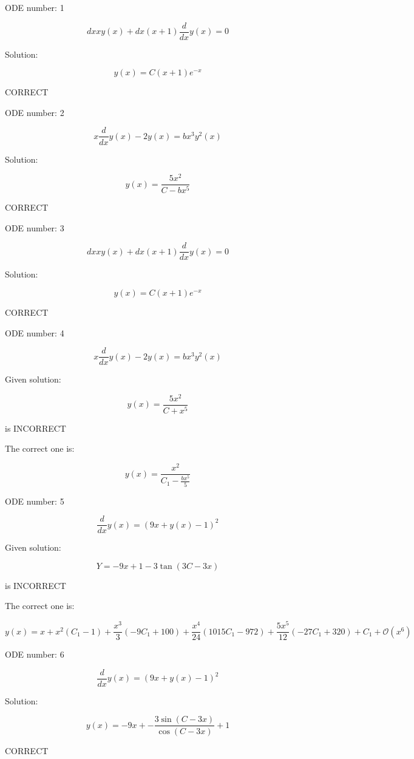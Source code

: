 \documentclass{article}
\begin{document}
        
ODE number: 1

$$
 dx x y{\left (x \right )} + dx \left(x + 1\right) \frac{d}{d x} y{\left (x \right )} = 0 
$$

Solution:

$$
 y{\left (x \right )} = C \left(x + 1\right) e^{- x} 
$$

CORRECT

ODE number: 2

$$
 x \frac{d}{d x} y{\left (x \right )} - 2 y{\left (x \right )} = b x^{3} y^{2}{\left (x \right )} 
$$

Solution:

$$
 y{\left (x \right )} = \frac{5 x^{2}}{C - b x^{5}} 
$$

CORRECT

ODE number: 3

$$
 dx x y{\left (x \right )} + dx \left(x + 1\right) \frac{d}{d x} y{\left (x \right )} = 0 
$$

Solution:

$$
 y{\left (x \right )} = C \left(x + 1\right) e^{- x} 
$$

CORRECT

ODE number: 4

$$
 x \frac{d}{d x} y{\left (x \right )} - 2 y{\left (x \right )} = b x^{3} y^{2}{\left (x \right )} 
$$

Given solution:

$$
 y{\left (x \right )} = \frac{5 x^{2}}{C + x^{5}} 
$$

 is INCORRECT

The correct one is:

$$
 y{\left (x \right )} = \frac{x^{2}}{C_{1} - \frac{b x^{5}}{5}} 
$$

ODE number: 5

$$
 \frac{d}{d x} y{\left (x \right )} = \left(9 x + y{\left (x \right )} - 1\right)^{2} 
$$

Given solution:

$$
 Y = - 9 x + 1 - 3 \tan{\left (3 C - 3 x \right )} 
$$

 is INCORRECT

The correct one is:

$$
 y{\left (x \right )} = x + x^{2} \left(C_{1} - 1\right) + \frac{x^{3}}{3} \left(- 9 C_{1} + 100\right) + \frac{x^{4}}{24} \left(1015 C_{1} - 972\right) + \frac{5 x^{5}}{12} \left(- 27 C_{1} + 320\right) + C_{1} + \mathcal{O}\left(x^{6}\right) 
$$

ODE number: 6

$$
 \frac{d}{d x} y{\left (x \right )} = \left(9 x + y{\left (x \right )} - 1\right)^{2} 
$$

Solution:

$$
 y{\left (x \right )} = - 9 x + - \frac{3 \sin{\left (C - 3 x \right )}}{\cos{\left (C - 3 x \right )}} + 1 
$$

CORRECT
\end{document}

